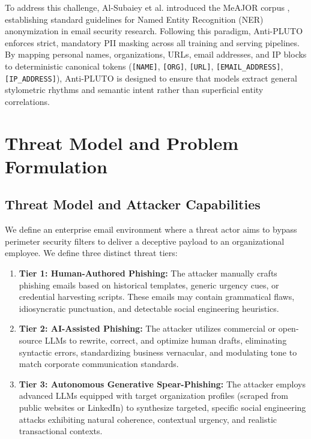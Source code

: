 \documentclass[journal]{IEEEtran}
\begin{document}
To address this challenge, Al-Subaiey et al. introduced the MeAJOR corpus \cite{meajor2025corpus}, establishing standard guidelines for Named Entity Recognition (NER) anonymization in email security research. Following this paradigm, Anti-PLUTO enforces strict, mandatory PII masking across all training and serving pipelines. By mapping personal names, organizations, URLs, email addresses, and IP blocks to deterministic canonical tokens (\texttt{[NAME]}, \texttt{[ORG]}, \texttt{[URL]}, \texttt{[EMAIL\_ADDRESS]}, \texttt{[IP\_ADDRESS]}), Anti-PLUTO is designed to ensure that models extract general stylometric rhythms and semantic intent rather than superficial entity correlations.

\section{Threat Model and Problem Formulation}
\label{sec:threat_model}

\subsection{Threat Model and Attacker Capabilities}
We define an enterprise email environment where a threat actor aims to bypass perimeter security filters to deliver a deceptive payload to an organizational employee. We define three distinct threat tiers:
\begin{enumerate}
    \item \textbf{Tier 1: Human-Authored Phishing:} The attacker manually crafts phishing emails based on historical templates, generic urgency cues, or credential harvesting scripts. These emails may contain grammatical flaws, idiosyncratic punctuation, and detectable social engineering heuristics.
    \item \textbf{Tier 2: AI-Assisted Phishing:} The attacker utilizes commercial or open-source LLMs to rewrite, correct, and optimize human drafts, eliminating syntactic errors, standardizing business vernacular, and modulating tone to match corporate communication standards.
    \item \textbf{Tier 3: Autonomous Generative Spear-Phishing:} The attacker employs advanced LLMs equipped with target organization profiles (scraped from public websites or LinkedIn) to synthesize targeted, specific social engineering attacks exhibiting natural coherence, contextual urgency, and realistic transactional contexts.
\end{enumerate}
\end{document}
